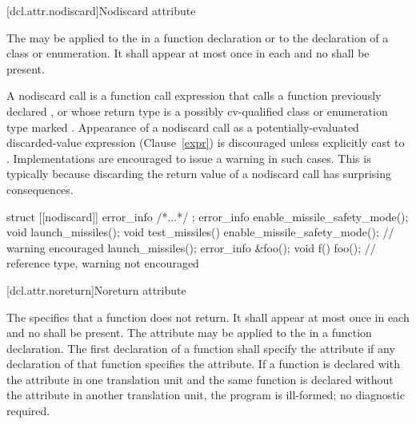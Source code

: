 [dcl.attr.nodiscard]{Nodiscard attribute}%

\pnum
The  
may be applied to the 
in a function declaration or to the declaration of a class or enumeration.
It shall appear at most once in each  and
no  shall be present.

\pnum
\begin{note}
A nodiscard call is a function call expression that
calls a function previously declared , or
whose return type is a possibly cv-qualified class or enumeration type
marked . Appearance of a nodiscard call as
a potentially-evaluated discarded-value expression (Clause~\ref{expr})
is discouraged unless explicitly cast to .
Implementations are encouraged to issue a warning in such cases.
This is typically because discarding the return value
of a nodiscard call has surprising consequences.
\end{note}

\pnum
\begin{example}
\begin{codeblock}
struct [[nodiscard]] error_info { /*...*/ };
error_info enable_missile_safety_mode();
void launch_missiles();
void test_missiles() {
  enable_missile_safety_mode(); // warning encouraged
  launch_missiles();
}
error_info &foo();
void f() { foo(); } // reference type, warning not encouraged
\end{codeblock}
\end{example}

[dcl.attr.noreturn]{Noreturn attribute}%

\pnum
The   specifies that a function does not return. It
shall appear at most once in each  and no
 shall be present. The attribute may be applied to the
 in a function declaration. The first declaration of a function shall
specify the  attribute if any declaration of that function specifies the
 attribute. If a function is declared with the  attribute in one
translation unit and the same function is declared without the  attribute in another
translation unit, the program is ill-formed; no diagnostic required.

